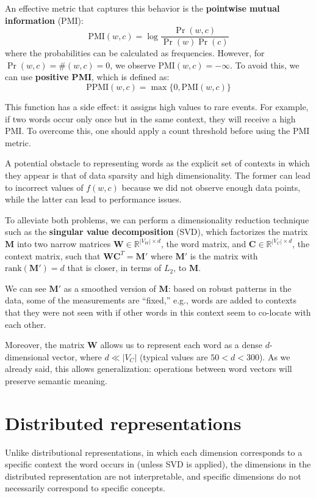 An effective metric that captures this behavior is the \textbf{pointwise mutual information} (PMI):
\[
\text{PMI}(w,c)=\log\frac{\Pr(w,c)}{\Pr(w)\Pr(c)}
\]
where the probabilities can be calculated as frequencies. However, for $\Pr(w,c)=\#(w,c)=0$, we observe $\text{PMI}(w,c)=-\infty$. To avoid this, we can use \textbf{positive PMI}, which is defined as:
\[
\text{PPMI}(w,c)=\max\{0, \text{PMI}(w,c)\}
\]

This function has a side effect: it assigns high values to rare events. For example, if two words occur only once but in the same context, they will receive a high $\text{PMI}$. To overcome this, one should apply a count threshold before using the $\text{PMI}$ metric.

A potential obstacle to representing words as the explicit set of contexts in which they appear is that of data sparsity and high dimensionality. The former can lead to incorrect values of $f(w,c)$ because we did not observe enough data points, while the latter can lead to performance issues.

To alleviate both problems, we can perform a dimensionality reduction technique such as the \textbf{singular value decomposition} (SVD), which factorizes the matrix $\mathbf{M}$ into two narrow matrices $\mathbf{W}\in \mathbb{R}^{|V_{W}|\times d}$, the word matrix, and $\mathbf{C}\in \mathbb{R}^{|V_{C}|\times d}$, the context matrix, such that $\mathbf{W}\mathbf{C}^{T}=\mathbf{M}'$ where $\mathbf{M}'$ is the matrix with $\text{rank}(\mathbf{M}')=d$ that is closer, in terms of $L_{2}$, to $\mathbf{M}$.

We can see $\mathbf{M}'$ as a smoothed version of $\mathbf{M}$: based on robust patterns in the data, some of the measurements are ``fixed,'' e.g., words are added to contexts that they were not seen with if other words in this context seem to co-locate with each other.

Moreover, the matrix $\mathbf{W}$ allows us to represent each word as a dense $d$-dimensional vector, where $d \ll |V_{C}|$ (typical values are $50 < d < 300$). As we already said, this allows generalization: operations between word vectors will preserve semantic meaning.

\section{Distributed representations}
Unlike distributional representations, in which each dimension corresponds to a specific context the word occurs in (unless SVD is applied), the dimensions in the distributed representation are not interpretable, and specific dimensions do not necessarily correspond to specific concepts.

